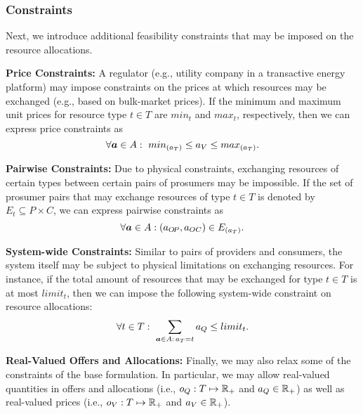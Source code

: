 \subsubsection{Constraints}
\label{sec:extConstr}

Next, we introduce additional feasibility constraints that may be imposed on the resource allocations.

\textbf{Price Constraints:}
A regulator (e.g., utility company in a transactive energy platform) may impose constraints on the prices at which resources may be exchanged (e.g., based on bulk-market prices).
If the minimum and maximum unit prices for resource type $t \in T$ are $min_t$ and $max_t$, respectively, then we can express price constraints as
\begin{equation}
    \forall \boldsymbol{a} \in A: ~ min_{\left( a_T \right)} \leq a_V \leq max_{\left( a_T \right)} . 
\end{equation}

\textbf{Pairwise Constraints:}
Due to physical constraints, exchanging resources of certain types between certain pairs of prosumers may be impossible.
If the set of prosumer pairs that may exchange resources of type $t \in T$ is denoted by~$E_t \subseteq P \times C$,  we can express pairwise constraints as
\begin{equation}
    \forall \boldsymbol{a} \in A: \left( a_{O\!P} , a_{OC} \right) \in E_{\left( a_T \right)} .
\end{equation}

\textbf{System-wide Constraints:}
Similar to pairs of providers and consumers, the system itself may be subject to physical limitations on exchanging resources.
For instance, if the total amount of resources that may be exchanged for type $t \in T$ is at most $limit_t$, then we can impose the following system-wide constraint on resource allocations:
\begin{equation}
\forall t \in T: ~
    \sum_{\boldsymbol{a} \in A: \, a_T = t} a_Q \leq {limit}_t .
\end{equation}

\textbf{Real-Valued Offers and Allocations:}
Finally, we may also relax some of the constraints of the base formulation.
In particular, we may allow real-valued quantities in offers and allocations (i.e., $o_Q: T \mapsto \mathbb{R}_+$ and $a_Q \in \mathbb{R}_+$) as well as real-valued prices (i.e., $o_V: T \mapsto \mathbb{R}_+$ and $a_V \in \mathbb{R}_+$).









